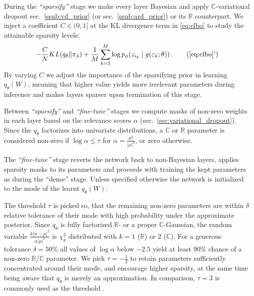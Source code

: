 \documentclass[a4paper,10pt,onecolumn]{article}
\newcommand{\real}{\mathbb{R}}
\newcommand{\cplx}{\mathbb{C}}
\begin{document}
During the \textit{``sparsify''} stage we make every layer Bayesian and apply $\cplx$-variational
dropout sec.~\ref{ssub:vd_prior} (or sec.~\ref{ssub:ard_prior}) or its $\real$ counterpart.
We inject a coefficient $
  C \in (0, 1]
$ at the KL divergence term in \eqref{eq:elbo} to study the attainable sparsity levels:
\begin{equation}  \label{eq:elbo_with_coef}
  - \frac{C}N KL(q_{\theta} \| \pi_{\lambda})
  + \frac1{M} \sum_{k=1}^M
      \log p_{\phi}(z_{i_k} \mid g(\varepsilon_k; \theta))
  \,.
  \tag{\ref{eq:elbo}'}
\end{equation}
By varying $C$ we adjust the importance of the sparsifying prior in learning $q_\theta(W)$,
meaning that higher value yields more irrelevant parameters during inference and makes
layers sparser upon termination of this stage.

Between \textit{``sparsify''} and \textit{``fine-tune''} stages we compute masks of non-zero
weights in each layer based on the relevance scores $\alpha$ (sec.~\ref{sec:variational_dropout}).
Since the $q_\theta$ factorizes into univariate distributions, a $\cplx$ or $\real$ parameter
is considered non-zero if $\log \alpha \leq \tau$ for $
  \alpha = \tfrac{\sigma^2}{\lvert\mu\rvert^2}
$, or zero otherwise.

The \textit{``fine-tune''} stage reverts the network back to non-Bayesian layers, applies
sparsity masks to its parameters and proceeds with training the kept parameters as during
the ``dense'' stage. Unless specified otherwise the network is initialized to the mode
of the learnt $q_\theta(W)$.

The threshold $\tau$ is picked so, that the remaining non-zero parameters are within
$\delta$ relative tolerance of their mode with high probability under the approximate
posterior. Since $q_\theta$ is fully factorized $\real$- or a proper $\cplx$-Gaussian,
the random variable $
  \tfrac{k \lvert w - \mu \rvert^2}
        {\alpha \lvert \mu \rvert^2}
$ is $\chi^2_k$ distributed with $k=1$ ($\real$) or $2$ ($\cplx$).
%
For a generous tolerance $\delta = 50\%$ all values of $\log \alpha$ below $-2.5$ yield
at least $90\%$ chance of a non-zero $\real$/$\cplx$ parameter. We pick $\tau = -\tfrac12$
to retain parameters sufficiently concentrated around their mode, and encourage higher
sparsity, at the same time being aware that $q_\theta$ is merely an approximation.
In comparison, $\tau = 3$ is commonly used as the threshold
\citep{molchanov_variational_2017,kingma_variational_2015}.
\end{document}

